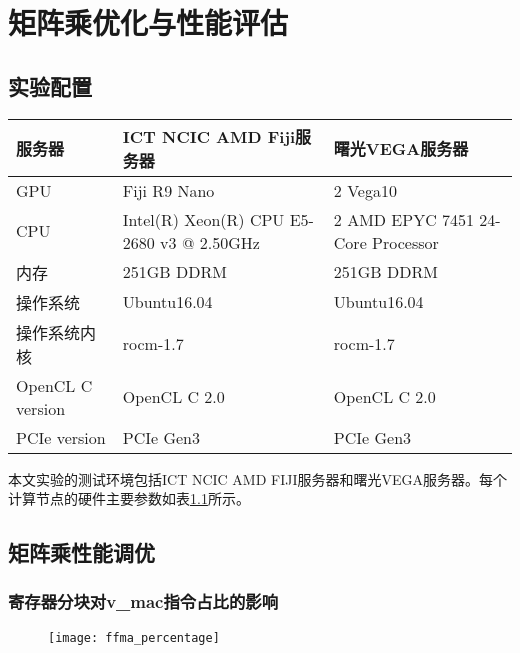 \chapter{矩阵乘优化与性能评估}\label{chap:GEMMOpt}

\section{实验配置}
\begin{table}[htbp]
	\label{tab:hardwareplatform}
	\begin{center}
		\begin{tabular}{ | l | p{6cm} | p{6cm} |}
			\hline
			服务器 & ICT NCIC AMD Fiji服务器 & 曙光VEGA服务器 \\ \hline
			GPU & Fiji R9 Nano & 2 Vega10 \\ \hline
			CPU & Intel(R) Xeon(R) CPU E5-2680 v3 @ 2.50GHz & 2 AMD EPYC 7451 24-Core Processor \\ \hline
			内存 & 251GB DDRM & 251GB DDRM \\ \hline
			操作系统 & Ubuntu16.04 & Ubuntu16.04 \\ \hline
			操作系统内核 & rocm-1.7 & rocm-1.7 \\ \hline
			OpenCL C version & OpenCL C 2.0 & OpenCL C 2.0 \\ \hline
			PCIe version & PCIe Gen3 & PCIe Gen3 \\
			\hline
		\end{tabular}
	\end{center}	
\end{table}

本文实验的测试环境包括ICT NCIC AMD FIJI服务器和曙光VEGA服务器。每个计算节点的硬件主要参数如表\ref{tab:hardwareplatform}所示。


\section{矩阵乘性能调优}

\subsection{寄存器分块对v\_mac指令占比的影响}
\begin{figure}[htbp]
	\centering
	\texttt{[image: ffma\_percentage]}
	\label{fig:ffma_percentage}
\end{figure}

